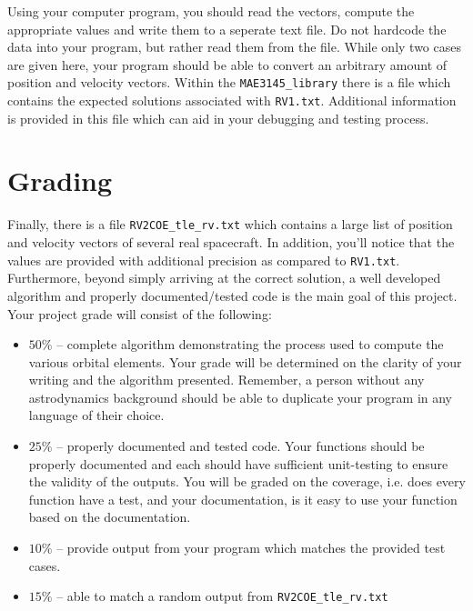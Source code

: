 \documentclass[11pt, reqno]{article}    %
\begin{document}
Using your computer program, you should read the vectors, compute the appropriate values and write them to a seperate text file.
Do not hardcode the data into your program, but rather read them from the file. 
While only two cases are given here, your program should be able to convert an arbitrary amount of position and velocity vectors.
Within the \texttt{MAE3145\_library} there is a file which contains the expected solutions associated with \texttt{RV1.txt}. 
Additional information is provided in this file which can aid in your debugging and testing process. 

\section*{Grading}
Finally, there is a file \texttt{RV2COE\_tle\_rv.txt} which contains a large list of position and velocity vectors of several real spacecraft. 
In addition, you'll notice that the values are provided with additional precision as compared to \texttt{RV1.txt}. 
Furthermore, beyond simply arriving at the correct solution, a well developed algorithm and properly documented/tested code is the main goal of this project.
Your project grade will consist of the following:
\begin{itemize}
    \item \( 50 \% \) -- complete algorithm demonstrating the process used to compute the various orbital elements. 
        Your grade will be determined on the clarity of your writing and the algorithm presented. 
        Remember, a person without any astrodynamics background should be able to duplicate your program in any language of their choice.
    \item \( 25 \% \) -- properly documented and tested code. 
        Your functions should be properly documented and each should have sufficient unit-testing to ensure the validity of the outputs. 
        You will be graded on the coverage, i.e. does every function have a test, and your documentation, is it easy to use your function based on the documentation.
    \item \( 10 \% \) -- provide output from your program which matches the provided test cases.
    \item \( 15 \% \) -- able to match a random output from \texttt{RV2COE\_tle\_rv.txt}
\end{itemize}
\end{document}
